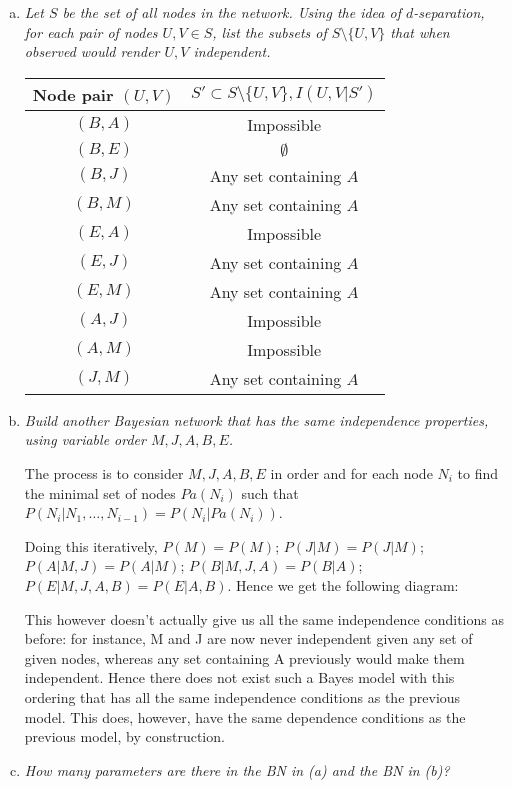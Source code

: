 \documentclass{article}
\begin{document}
\begin{enumerate}[(a)]
\item \textit{Let $S$ be the set of all nodes in the network. Using
  the idea of $d$-separation, for each pair of nodes $U,V\in S$, list
  the subsets of $S\setminus \{U,V\}$ that when observed would render
  $U,V$ independent.}

  \begin{tabular}{|c|c|}
  \hline
  Node pair $(U,V)$ & $S'\subset S\setminus \{U,V\},I(U,V|S')$ \\
  \hline
  $(B, A)$ & Impossible \\
  $(B, E)$ & $\emptyset$ \\
  $(B, J)$ & Any set containing $A$ \\
  $(B, M)$ & Any set containing $A$ \\
  $(E, A)$ & Impossible \\
  $(E, J)$ & Any set containing $A$ \\
  $(E, M)$ & Any set containing $A$ \\
  $(A, J)$ & Impossible \\
  $(A, M)$ & Impossible \\
  $(J, M)$ & Any set containing $A$ \\
  \hline
  \end{tabular}

\item \textit{Build another Bayesian network that has the same
  independence properties, using variable order $M,J,A,B,E$.}

  The process is to consider $M,J,A,B,E$ in order and for each node
  $N_i$ to find the minimal set of nodes $Pa(N_i)$ such that
  $P(N_i|N_1,\ldots,N_{i-1})=P(N_i|Pa(N_i))$.

  Doing this iteratively, $P(M)=P(M)$; $P(J|M)=P(J|M)$;
  $P(A|M,J)=P(A|M)$; $P(B|M,J,A)=P(B|A)$; $P(E|M,J,A,B)=P(E|A,B)$. Hence
  we get the following diagram:

\begin{center}
\end{center}
This however doesn't actually give us all the same independence conditions
as before: for instance, M and J are now never independent given any set
of given nodes, whereas any set containing A previously would make them 
independent. 
Hence there does not exist such a Bayes model with this ordering that has
all the same independence conditions as the previous model.
This does, however, have the same dependence conditions as the previous
model, by construction. 
\item \textit{How many parameters are there in the BN in (a) and the
  BN in (b)?}


\end{enumerate}
\end{document}
